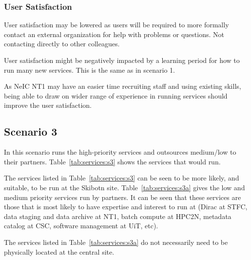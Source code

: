 \documentclass[12pt,a4paper]{article}
\newcommand{\nnt}{NeIC NT1\xspace}
\begin{document}

\subsubsection*{User Satisfaction}
\bitm
\item \ED User satisfaction may be lowered as users will be required to more formally contact an external
  organization for help with problems or questions. Not contacting directly to other \EC colleagues.
\item User satisfaction might be negatively impacted by a learning period for how to run many new services.
  This is the same as in scenario 1. %
\item As \nnt may have an easier time recruiting staff and using existing skills,
  being able to draw on wider range of experience in running services should improve the user satisfaction.
\eitm


\subsection{Scenario 3}
\label{ssec:scen3}

In this scenario \EC runs the high-priority services and outsources medium/low to their partners.
Table~\ref{tab:services:s3} shows the services that \EC would run.

The services listed in Table~\ref{tab:services:s3} can be seen to be more likely, and suitable, to be run at the
Skibotn site.
Table~\ref{tab:services:s3a} gives the low and medium priority services run by \EC partners.
It can be seen that these services are those that \EC is most likely to have expertise and interest to run at 
(Dirac at STFC, data staging and data archive at NT1, batch compute at HPC2N,
metadata catalog at CSC, software management at UiT, etc).

The services listed in Table~\ref{tab:services:s3a} do not necessarily need to be physically located at the \ED central site. 
\end{document}
